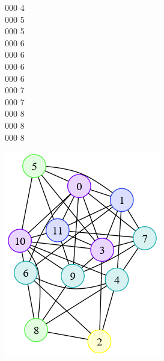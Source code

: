 \documentclass{article}
\begin{document}
\begin{enumerate}
\colorbox[HTML]{ffff00}{\color[HTML]{ffff00} 000} 4 \\
\colorbox[HTML]{51f242}{\color[HTML]{51f242} 000} 5 \\
\colorbox[HTML]{51f242}{\color[HTML]{51f242} 000} 5 \\
\colorbox[HTML]{17afaf}{\color[HTML]{17afaf} 000} 6 \\
\colorbox[HTML]{17afaf}{\color[HTML]{17afaf} 000} 6 \\
\colorbox[HTML]{17afaf}{\color[HTML]{17afaf} 000} 6 \\
\colorbox[HTML]{17afaf}{\color[HTML]{17afaf} 000} 6 \\
\colorbox[HTML]{2942f2}{\color[HTML]{2942f2} 000} 7 \\
\colorbox[HTML]{2942f2}{\color[HTML]{2942f2} 000} 7 \\
\colorbox[HTML]{8000ff}{\color[HTML]{8000ff} 000} 8 \\
\colorbox[HTML]{8000ff}{\color[HTML]{8000ff} 000} 8 \\
\colorbox[HTML]{8000ff}{\color[HTML]{8000ff} 000} 8

  \includegraphics{ex6b.png}
\end{enumerate}
\end{document}
